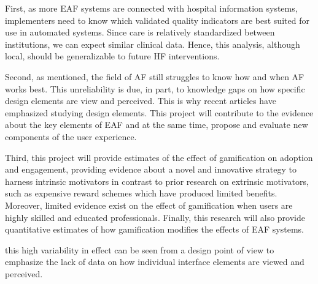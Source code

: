 First, as more \gls{EAF} systems are connected with hospital information systems, implementers need to know which validated quality indicators are best suited for use in automated systems. Since care is relatively standardized between institutions, we can expect similar clinical data. Hence, this analysis, although local, should be generalizable to future \gls{HF} interventions. 

Second, as mentioned, the field of \gls{AF} still struggles to know how and when \gls{AF} works best. This unreliability is due, in part, to knowledge gaps on how specific design elements are view and perceived. This is why recent articles have emphasized studying design elements. This project will contribute to the evidence about the key elements of \gls{EAF} and at the same time, propose and evaluate new components of the user experience. 

Third, this project will provide estimates of the effect of gamification on adoption and engagement, providing evidence about a novel and innovative strategy to harness intrinsic motivators in contrast to prior research on extrinsic motivators, such as expensive reward schemes which have produced limited benefits. Moreover, limited evidence exist on the effect of gamification when users are highly skilled and educated professionals. Finally, this research will also provide quantitative estimates of how gamification modifies the effects of \gls{EAF} systems. 



this high variability in effect can be seen from a design point of view to emphasize the lack of data on how individual interface elements are viewed and perceived.
